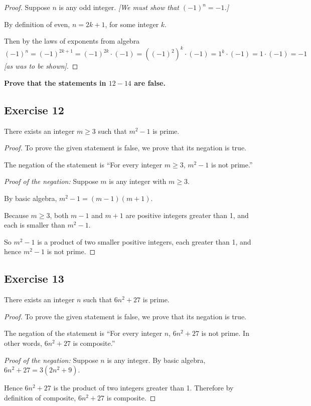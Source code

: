 \documentclass[14pt]{extarticle}
\newcommand{\cy}{\color{cyan}}
\begin{document}
\begin{proof}
Suppose $n$ is any odd integer. {\it [We must show that $(-1)^n = -1$.]}

By definition of even, $n = 2k+1$, for some integer $k$. 

Then by the laws of exponents from algebra 
\[
(-1)^n = (-1)^{2k+1} = (-1)^{2k}\cdot(-1) = ((-1)^2)^k\cdot(-1) = 1^k\cdot(-1) = 1\cdot(-1) = -1
\] 
{\it [as was to be shown]}.
\end{proof}

{\bf \cy Prove that the statements in $12-14$ are false.}

\subsection{Exercise 12}
There exists an integer $m \geq 3$ such that $m^2 - 1$ is prime.

\begin{proof}
To prove the given statement is false, we prove that its
negation is true.

The negation of the statement is “For every integer $m \geq 3$, $m^2 - 1$ is not prime.”

{\it Proof of the negation:} Suppose $m$ is any integer with $m \geq 3$. 

By basic algebra, $m^2 - 1 = (m - 1)(m + 1)$. 

Because $m \geq 3$, both $m - 1$ and $m + 1$ are positive integers greater than 1, and each is smaller than $m^2 - 1$. 

So $m^2 - 1$ is a product of two smaller positive integers, each greater than 1, and hence $m^2 - 1$ is not prime.
\end{proof}

\subsection{Exercise 13}
There exists an integer $n$ such that $6n^2 + 27$ is prime.

\begin{proof}
To prove the given statement is false, we prove that its
negation is true.

The negation of the statement is “For every integer $n$, $6n^2+27$ is not prime. In other words, $6n^2+27$ is composite.”

{\it Proof of the negation:} Suppose $n$ is any integer. 
By basic algebra, $6n^2 + 27 = 3(2n^2 + 9)$. 

Hence $6n^2+27$ is the product of two integers greater than 1. Therefore by definition of composite, $6n^2+27$ is composite.
\end{proof}
\end{document}
